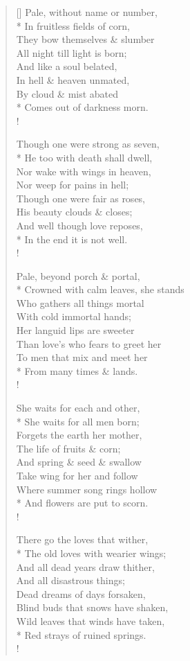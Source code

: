 \documentclass[MAIN]{subfiles}
\begin{document}
\begin{verse}[\versewidth]
Pale, without name or number,\\*
\vin In fruitless fields of corn,\\
They bow themselves \& slumber\\
\vin All night till light is born;\\
And like a soul belated,\\
In hell \& heaven unmated,\\
By cloud \& mist abated\\*
\vin Comes out of darkness morn.\\!

Though one were strong as seven,\\*
\vin He too with death shall dwell,\\
Nor wake with wings in heaven,\\
\vin Nor weep for pains in hell;\\
Though one were fair as roses,\\
His beauty clouds \& closes;\\
And well though love reposes,\\*
\vin In the end it is not well.\\!

Pale, beyond porch \& portal,\\*
\vin Crowned with calm leaves, she stands\\
Who gathers all things mortal\\
\vin With cold immortal hands;\\
Her languid lips are sweeter\\ 
Than love's who fears to greet her\\
To men that mix and meet her\\*
\vin From many times \& lands.\\!

She waits for each and other,\\*
\vin She waits for all men born;\\
Forgets the earth her mother,\\
\vin The life of fruits \& corn;\\
And spring \& seed \& swallow\\ 
Take wing for her and follow\\
Where summer song rings hollow\\*
\vin And flowers are put to scorn.\\!

There go the loves that wither,\\*
\vin The old loves with wearier wings;\\
And all dead years draw thither,\\
\vin And all disastrous things;\\
Dead dreams of days forsaken,\\
Blind buds that snows have shaken,\\
Wild leaves that winds have taken,\\*
\vin Red strays of ruined springs.\\!


\end{verse}
\end{document}
